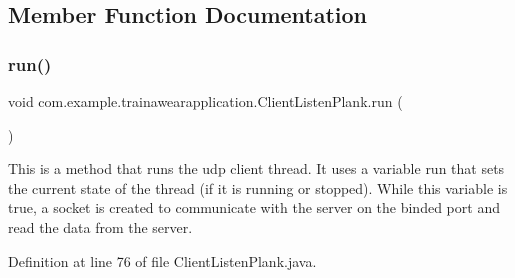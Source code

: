 \subsection{Member Function Documentation}
\mbox{\label{classcom_1_1example_1_1trainawearapplication_1_1_client_listen_plank_adb139f918c79291e8492364927a0b945}} 
\subsubsection{\texorpdfstring{run()}{run()}}
{\footnotesize\ttfamily void com.\+example.\+trainawearapplication.\+Client\+Listen\+Plank.\+run (\begin{DoxyParamCaption}{ }\end{DoxyParamCaption})\hspace{0.3cm}{\ttfamily [inline]}}

This is a method that runs the udp client thread. It uses a variable run that sets the current state of the thread (if it is running or stopped). While this variable is true, a socket is created to communicate with the server on the binded port and read the data from the server.

Definition at line 76 of file Client\+Listen\+Plank.\+java.


